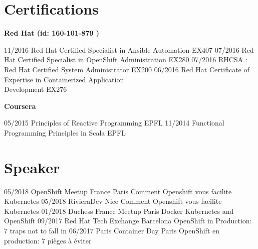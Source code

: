 \documentclass[]{friggeri-cv}
\begin{document}
\section{Certifications}        
    \textbf{ Red Hat (id: 160-101-879 ) \vspace{0.1cm}\\}        
	\begin{entrylist}
	
	\setlength{\parsepsave}{\parsep}%
	\setlength{\parsep}{-3pt}%
	
	\entryNoDetail
		{11/2016}
		{Red Hat Certified Specialist in Ansible Automation}
	    {EX407}
	    \entryNoDetail
	    {07/2016}
	    {Red Hat Certified Specialist in OpenShift Administration}
	    {EX280}
	    \entryNoDetail
	    {07/2016}
	    {RHCSA : Red Hat Certified System Administrator }
	    {EX200}   
	    \entryNoDetail
	    {06/2016}
	    {Red Hat Certificate of Expertise in Containerized Application \\ Development}
	    {EX276}
	\end{entrylist}    
	\textbf{Coursera \vspace{0.1cm}\\}    
	\begin{entrylist}
	\entryNoDetail
		{05/2015} 
		{Principles of Reactive Programming }
		{EPFL}
		\entryNoDetail
		{11/2014}
		{Functional Programming Principles in Scala}
		{EPFL}
	\end{entrylist}    
\section{Speaker}  
\setlength{\parsepsave}{\parsep}%
\setlength{\parsep}{3pt}%
	\begin{entrylist}	
		\entry
		{05/2018}
		{OpenShift Meetup France}
		{Paris}
		{Comment Openshift vous facilite Kubernetes }	
		\entry
		{05/2018}
		{RivieraDev}
		{Nice}
		{Comment Openshift vous facilite Kubernetes }	
		\entry
		{01/2018 }
		{Duchess France Meetup}
		{Paris}
		{Docker Kubernetes and OpenShift}	
		\entry
		{09/2017}
		{Red Hat Tech Exchange}
		{Barcelona}
		{OpenShift in Production: 7 traps not to fall in}	
		\entry
		{06/2017}
		{Paris Container Day}
		{Paris}
		{OpenShift en production: 7 pièges à éviter } 
	\end{entrylist}
\setlength{\parsep}{\parsepsave}%
\\
\end{document}

